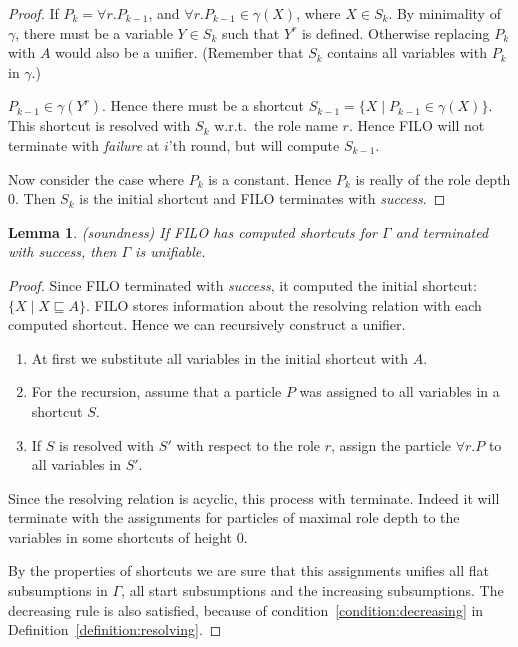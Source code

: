 \documentclass{article}
\newtheorem{lemma}{Lemma}
\newcommand{\wrt}{w.r.t.\ }
\begin{document}
\begin{proof}
	If $P_k = \forall r.P_{k-1}$, and $\forall r.P_{k-1} \in \gamma(X)$, where $X \in S_k$. By minimality of $\gamma$,
	there must be a variable $Y \in S_k$ such that $Y^r$ is defined. Otherwise replacing $P_k$ with $A$ would also be a unifier.
	(Remember that $S_k$ contains all variables with $P_k$ in $\gamma$.)
	
	$P_{k-1} \in \gamma(Y^r)$. Hence there must be a shortcut $S_{k-1} = \{X \mid P_{k-1} \in \gamma(X)\}$. This shortcut is resolved
	with $S_k$ \wrt the role name $r$. Hence FILO will not terminate with \emph{failure} at $i$'th round, but will compute $S_{k-1}$.
	
	Now consider the case where $P_k$ is a constant. Hence $P_k$ is really of the role depth $0$.
	Then $S_k$ is the initial shortcut and FILO terminates with \emph{success}.
	
\end{proof}

\begin{lemma}(soundness) \label{lemma:shsoundness}
	If FILO has computed shortcuts for $\Gamma$ and terminated with \emph{success}, then  $\Gamma$ is unifiable.
\end{lemma}
\begin{proof}
	Since FILO terminated with \emph{success}, it computed the initial shortcut: $\{X \mid X \sqsubseteq A\}$. FILO stores information about
	the resolving relation with each computed shortcut.
	Hence we can recursively construct a unifier.
	\begin{enumerate}
		\item At first we substitute all variables in the initial shortcut with $A$.
		\item For the recursion, assume that a particle $P$ was assigned to all variables in a shortcut $S$.
		\item If $S$ is resolved with $S'$ with respect to the role $r$, assign the particle $\forall r.P$ to all
		variables in $S'$.
	\end{enumerate}
	
	Since the resolving relation is acyclic, this process with terminate. Indeed it will terminate with the assignments for particles of maximal role depth
	to the variables in some shortcuts of height $0$.
	
	By the properties of shortcuts we are sure that this assignments unifies all flat subsumptions in $\Gamma$, all start subsumptions and 
	the increasing subsumptions. The decreasing rule is also satisfied, because of condition~\ref{condition:decreasing} in Definition~\ref{definition:resolving}.
\end{proof}
	
\end{document}
